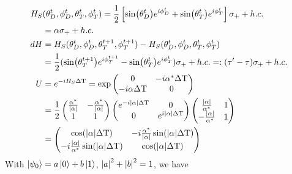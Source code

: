 \begin{align}
	H_S&(\theta_D^t, \phi_D^t, \theta_T^t, \phi_T^t) = \frac{1}{2} \left[\sin(\theta_D^t) e^{i\phi_D^t} + \sin(\theta_T^t) e^{i\phi_T^t}\right] \sigma_{+} + h.c. \nonumber \\
	& = \alpha \sigma_{+} + h.c. \nonumber \\
	dH & = H_S(\theta_D^t, \phi_D^t, \theta_T^{t+1}, \phi_T^{t+1}) - H_S(\theta_D^t, \phi_D^t, \theta_T^t, \phi_T^t) \nonumber \\
	& = \frac{1}{2}(\sin(\theta_T^{t+1})e^{i\phi_T^{t+1}} - \sin(\theta_T^t)e^{i\phi_T^t}) \sigma_{+} + h.c. =: (\tau' - \tau) \sigma_{+} + h.c. \nonumber \\
	U & = e^{-iH_S \Delta \mathrm{T}} = 
	\exp \begin{pmatrix}
	0 & -i\alpha^* \Delta \mathrm{T} \\
	-i \alpha \Delta \mathrm{T} & 0 \\
	\end{pmatrix} \nonumber \\
	& = 
	\frac{1}{2} \begin{pmatrix}
	\frac{\alpha^*}{\abs{\alpha}} & -\frac{\alpha^*}{\abs{\alpha}} \\
	1 & 1 \\
	\end{pmatrix}
	\begin{pmatrix}
	e^{-i\abs{\alpha} \Delta \mathrm{T}} & 0 \\
	0 & e^{i\abs{\alpha} \Delta \mathrm{T}} \\
	\end{pmatrix}
	\begin{pmatrix}
	\frac{\abs{\alpha}}{\alpha^*} & 1 \\
	-\frac{\abs{\alpha}}{\alpha^*} & 1 \\
	\end{pmatrix} \nonumber \\
	& = \begin{pmatrix}
	\cos(\abs{\alpha}\Delta \mathrm{T}) & -i\frac{\alpha^*}{\abs{\alpha}} \sin(\abs{\alpha}\Delta \mathrm{T}) \\
	-i\frac{\abs{\alpha}}{\alpha^*} \sin(\abs{\alpha}\Delta \mathrm{T}) & \cos(\abs{\alpha} \Delta \mathrm{T}) \\
	\end{pmatrix} \nonumber
\end{align}
With $\ket{\psi_0} = a \ket{0} + b \ket{1}$,  $\abs{a}^2 + \abs{b}^2 = 1$, we  have
